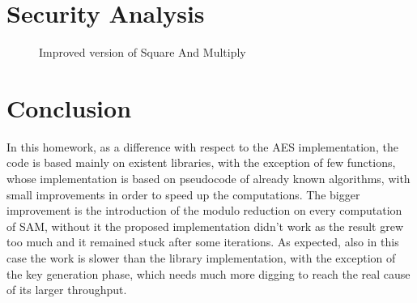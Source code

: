 \documentclass{article}
\begin{document}

\section{Security Analysis}
\label{sec:secAn}

\begin{figure}[H]
	\centering
	\caption{Improved version of Square And Multiply}
	\label{fig:sam}
\end{figure}


\section{Conclusion}

In this homework, as a difference with respect to the AES implementation, the code is based mainly on existent libraries, with the exception of few functions, whose implementation is based on pseudocode of already known algorithms, with small improvements in order to speed up the computations. The bigger improvement is the introduction of the modulo reduction on every computation of SAM, without it the proposed implementation didn't work as the result grew too much and it remained stuck after some iterations. As expected, also in this case the work is slower than the library implementation, with the exception of the key generation phase, which needs much more digging to reach the real cause of its larger throughput.






\end{document}
